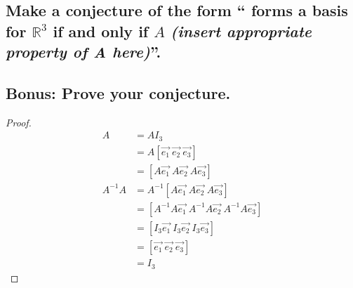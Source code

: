 \documentclass[../main.tex]{subfiles}
\begin{document}
\subsection{Make a conjecture of the form `` forms a basis for $\mathbb{R}^3$ if and only if $A$ \emph{(insert appropriate property of A here)}''.
}
\subsection{Bonus: Prove your conjecture.}
\begin{proof}
  \begin{align}
    A       & = AI_{3}                                                 \\
            & = A[\vec{e_1}\ \vec{e_2}\ \vec{e_3}]                     \\
            & = [A\vec{e_1}\ A\vec{e_2}\ A\vec{e_3}]                   \\
    A^{-1}A & = A^{-1}[A\vec{e_1}\ A\vec{e_2}\ A\vec{e_3}]             \\
            & = [A^{-1}A\vec{e_1}\ A^{-1}A\vec{e_2}\ A^{-1}A\vec{e_3}] \\
            & = [I_{3}\vec{e_1}\ I_{3}\vec{e_2}\ I_{3}\vec{e_3}]       \\
            & = [\vec{e_1}\ \vec{e_2}\ \vec{e_3}]                      \\
            & = I_{3}
  \end{align}
\end{proof}
\end{document}
